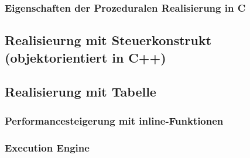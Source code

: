 \subsubsection{Eigenschaften der Prozeduralen Realisierung in C}






\subsection{Realisieurng mit Steuerkonstrukt (objektorientiert in C++)}



\subsection{Realisierung mit Tabelle}


\subsubsection{Performancesteigerung mit inline-Funktionen}


\subsubsection{Execution Engine}